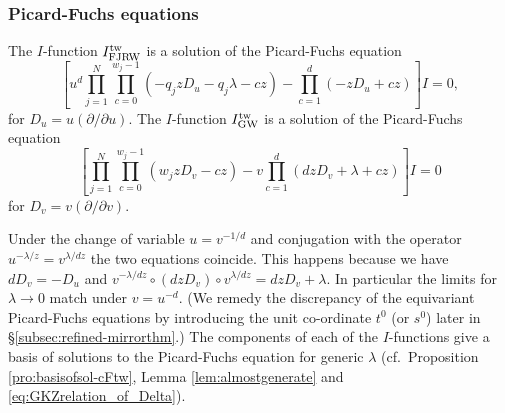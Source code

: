 \documentclass[11pt]{amsart}
\theoremstyle{definition} %
\theoremstyle{remark} %
\newcommand{\la}{\lambda}
\newcommand{\tw}{{\rm tw}}
\def\GW{\operatorname{\text{GW}}}
\newcommand{\FJRW}{{\operatorname{FJRW}}}
\renewcommand{\GW}{{\operatorname{GW}}}
\begin{document}
\subsubsection{Picard-Fuchs equations} 
The $I$-function $I^\tw_{\FJRW}$ is a solution of 
the Picard-Fuchs equation 
\begin{equation}
\label{eq:PFforRW}
\left[
u^d \prod_{j=1}^N 
\prod_{c=0}^{w_j-1} \left( -q_j zD_u -q_j \lambda - c z\right)-
\prod_{c=1}^d\left(-zD_u + cz\right)
\right]
I=0,
\end{equation}
for $D_u=u (\partial/\partial u)$.
The $I$-function $I^\tw_{\GW}$ is a solution of 
the Picard-Fuchs equation 
\begin{equation}
\label{eq:PFforGW}
\left[\prod_{j=1}^N \prod_{c=0}^{w_j-1}
\left({w_j} zD_v - cz\right)-
v\prod_{c=1}^d\left(dzD_v+\la+ c z \right)\right]I=0
\end{equation}
for $D_v=v (\partial/\partial v)$.

Under the change of variable $u= v^{-1/d}$ and 
conjugation with the operator $u^{-\la/z}=v^{\la/dz}$ 
the two equations coincide. 
This happens because we have $dD_v=-D_u$ and 
$v^{-\la/dz} \circ (dzD_v) \circ v^{\la/dz}= dzD_v+\la$.
In particular the limits for 
$\la\to 0$ match under $v=u^{-d}$. 
(We remedy the discrepancy of the equivariant 
Picard-Fuchs equations by introducing the unit 
co-ordinate $t^0$ (or $s^0$) later 
in \S \ref{subsec:refined-mirrorthm}.) 
The components of each of the $I$-functions give a basis 
of solutions to the Picard-Fuchs equation for generic $\lambda$ 
(cf.\ Proposition \ref{pro:basisofsol-cFtw}, 
Lemma \ref{lem:almostgenerate} and \eqref{eq:GKZrelation_of_Delta}).  
\end{document}
